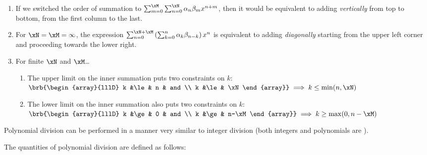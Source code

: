 \begin{proofns}
\begin{enumerate}
\item If we switched the order of summation to 
      $\sum_{m=0}^\xM \sum_{n=0}^\xN \alpha_n \beta_m x^{n+m}$,
      then it would be equivalent to adding {\em vertically} 
      from top to bottom, 
      from the first column to the last.

\item For $\xN=\xM=\infty$, the expression
      $\sum_{n=0}^{\xN+\xM} \left(\sum_{k=0}^n \alpha_k \beta_{n-k} \right) x^n$
      is equivalent to adding {\em diagonally} 
      starting from the upper left corner and proceeding 
      towards the lower right.

\item For finite $\xN$ and $\xM$\ldots
  \begin{enumerate}
    \item The upper limit on the inner summation puts two constraints on $k$:
      \\\indentx$\brb{\begin{array}{lllD}
        k &\le& n  & and \\
        k &\le& \xN
      \end{array}}
      \implies
      k\le\min(n,\xN)$

    \item The lower limit on the inner summation also puts two constraints on $k$:
      \\\indentx$\brb{\begin{array}{lllD}
        k &\ge& 0     & and \\
        k &\ge& n-\xM
      \end{array}}
      \implies
      k\ge\max(0,n-\xM)$
  \end{enumerate}
\end{enumerate}
\end{proofns}

Polynomial division can be performed in a manner very similar to integer division
(both integers and polynomials are ).



\begin{definition}
The quantities of polynomial division are defined as follows:
\end{definition}

